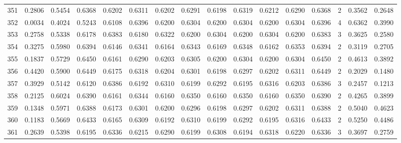 \begin{tabular}{lrrrrrrrrrrrrrrr}
351 &      0.2806 &  0.5454 &  0.6368 &  0.6202 &  0.6311 &  0.6202 &  0.6291 &  0.6198 &  0.6319 &  0.6212 &   0.6290 &     0.6368 &      2 &                    0.3562 &                     0.2648 \\
352 &      0.0034 &  0.4024 &  0.5243 &  0.6108 &  0.6396 &  0.6200 &  0.6304 &  0.6200 &  0.6304 &  0.6200 &   0.6304 &     0.6396 &      4 &                    0.6362 &                     0.3990 \\
353 &      0.2758 &  0.5338 &  0.6178 &  0.6383 &  0.6180 &  0.6322 &  0.6200 &  0.6304 &  0.6200 &  0.6304 &   0.6200 &     0.6383 &      3 &                    0.3625 &                     0.2580 \\
354 &      0.3275 &  0.5980 &  0.6394 &  0.6146 &  0.6341 &  0.6164 &  0.6343 &  0.6169 &  0.6348 &  0.6162 &   0.6353 &     0.6394 &      2 &                    0.3119 &                     0.2705 \\
355 &      0.1837 &  0.5729 &  0.6450 &  0.6161 &  0.6290 &  0.6203 &  0.6305 &  0.6200 &  0.6304 &  0.6200 &   0.6304 &     0.6450 &      2 &                    0.4613 &                     0.3892 \\
356 &      0.4420 &  0.5900 &  0.6449 &  0.6175 &  0.6318 &  0.6204 &  0.6301 &  0.6198 &  0.6297 &  0.6202 &   0.6311 &     0.6449 &      2 &                    0.2029 &                     0.1480 \\
357 &      0.3929 &  0.5142 &  0.6120 &  0.6386 &  0.6192 &  0.6310 &  0.6199 &  0.6292 &  0.6195 &  0.6316 &   0.6203 &     0.6386 &      3 &                    0.2457 &                     0.1213 \\
358 &      0.2125 &  0.6024 &  0.6390 &  0.6161 &  0.6344 &  0.6160 &  0.6350 &  0.6160 &  0.6350 &  0.6160 &   0.6350 &     0.6390 &      2 &                    0.4265 &                     0.3899 \\
359 &      0.1348 &  0.5971 &  0.6388 &  0.6173 &  0.6301 &  0.6200 &  0.6296 &  0.6198 &  0.6297 &  0.6202 &   0.6311 &     0.6388 &      2 &                    0.5040 &                     0.4623 \\
360 &      0.1183 &  0.5669 &  0.6433 &  0.6165 &  0.6309 &  0.6192 &  0.6310 &  0.6199 &  0.6292 &  0.6195 &   0.6316 &     0.6433 &      2 &                    0.5250 &                     0.4486 \\
361 &      0.2639 &  0.5398 &  0.6195 &  0.6336 &  0.6215 &  0.6290 &  0.6199 &  0.6308 &  0.6194 &  0.6318 &   0.6220 &     0.6336 &      3 &                    0.3697 &                     0.2759 \\

\end{tabular}
